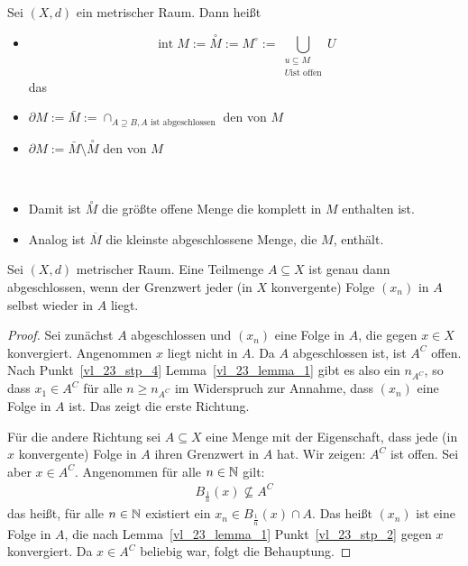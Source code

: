 \begin{Definition}{%
	Sei $(X,d)$ ein metrischer Raum. Dann heißt
	\begin{itemize}
		\item $$\mathop{int} M := \overset{\circ}{M} := M^{\circ} := \bigcup_{\substack{u \subseteq M\\ U \text{ist offen}}} U $$ das 
		\item $\partial M := \bar{M} := \cap_{A \supseteq B, A \text{ ist abgeschlossen}}$ den  von $M$ 
		\item $\partial M := \bar{M} \setminus \overset{\circ}{M}$ 
		den  von $M$
	\end{itemize}
}\end{Definition}

\begin{Bemerkung}{
	~\begin{itemize}
		\item Damit ist $\overset{\circ}{M}$ die größte offene Menge die komplett in 
	$M$ enthalten ist.
		\item Analog ist $\overline{M}$ die kleinste abgeschlossene Menge, die $M$, 
			enthält.
	\end{itemize}
}\end{Bemerkung}

\begin{Proposition}{\label{vl_23_prop_2}%
	Sei $(X,d)$ metrischer Raum. Eine Teilmenge $A \subseteq X$ ist genau dann 
	abgeschlossen, wenn der Grenzwert jeder (in $X$ konvergente) Folge 
	$(x_n)$ in $A$ selbst wieder in $A$ liegt. 
}\end{Proposition}

\begin{proof}
	Sei zunächst $A$ abgeschlossen und $(x_n)$ eine Folge in $A$, die gegen 
	$x \in X$ konvergiert. Angenommen $x$ liegt nicht in $A$. Da $A$ abgeschlossen 
	ist, ist $A^C$ offen. Nach Punkt~\ref{vl_23_stp_4} Lemma~\ref{vl_23_lemma_1} 
	gibt es also ein $n_{A^C}$, so dass $x_1 \in A^C$ für alle $ n \geq n_{A^C}$ 
	im Widerspruch zur Annahme, dass $(x_n)$ eine Folge in $A$ ist. 
	Das zeigt die erste Richtung.

	Für die andere Richtung sei $A \subseteq X$ 
	eine Menge mit der Eigenschaft, dass jede (in $x$ konvergente) Folge in $A$ 
	ihren Grenzwert in $A$ hat. Wir zeigen: $A^C$ ist offen. Sei aber 
	$x \in A^C$. Angenommen für alle $n \in \mathbb{N}$ gilt: 
	\begin{align*}
		B_{\frac{1}{n}}(x) \not \subseteq A^C
	\end{align*}
	das heißt, für alle $n \in \mathbb{N}$ existiert ein $x_n \in B_{\frac{1}{n}}(x) 
	\cap A$. Das heißt $(x_n)$ ist eine Folge in $A$, die nach Lemma~\ref{vl_23_lemma_1}
	Punkt~\ref{vl_23_stp_2} gegen $x$ konvergiert.
	Da $x \in A^C$ beliebig war, folgt die Behauptung.
\end{proof}

